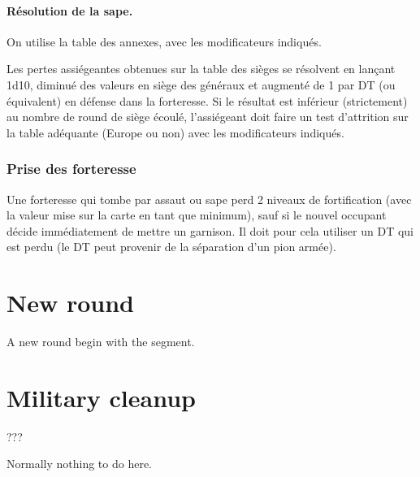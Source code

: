 \paragraph{Résolution de la sape.} On utilise la table des annexes,
avec les modificateurs indiqués.

Les pertes assiégeantes obtenues sur la table des sièges se résolvent
en lançant 1d10, diminué des valeurs en siège des généraux
et augmenté de 1 par DT (ou équivalent) en défense dans la forteresse.
Si le résultat est inférieur (strictement) au nombre de round
de siège écoulé, l'assiégeant doit faire un test d'attrition sur la table
adéquante (Europe ou non) avec les modificateurs indiqués.

\subsubsection{Prise des forteresse}
Une forteresse qui tombe par assaut ou sape perd 2 niveaux de
fortification (avec la valeur mise sur la carte en tant que minimum),
sauf si le nouvel occupant décide immédiatement de mettre un
garnison. Il doit pour cela utiliser un DT qui est perdu (le DT peut
provenir de la séparation d'un pion armée).



\section{New round}
A new round begin with the  segment.

\section{Military cleanup}
\label{chMilitary:cleanup}
???

Normally nothing to do here.


